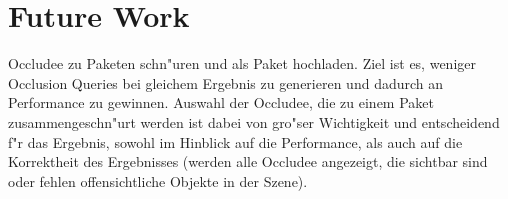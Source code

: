 \documentclass[journal]{vgtc}
\begin{document}
\section{Future Work}
Occludee zu Paketen schn"uren und als Paket hochladen. Ziel ist es, weniger Occlusion Queries bei gleichem Ergebnis zu generieren und dadurch an Performance zu gewinnen.
Auswahl der Occludee, die zu einem Paket zusammengeschn"urt werden ist dabei von gro"ser Wichtigkeit und entscheidend f"r das Ergebnis, sowohl im Hinblick auf die Performance, als auch auf die Korrektheit des Ergebnisses (werden alle Occludee angezeigt, die sichtbar sind oder fehlen offensichtliche Objekte in der Szene).

 

\end{document}
